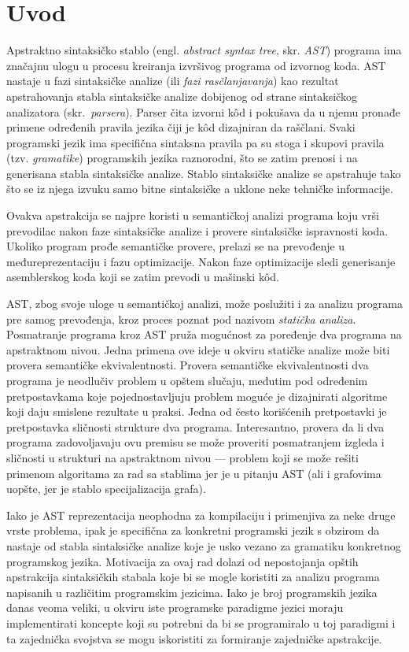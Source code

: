 \chapter{Uvod}
\label{chp:Intro}

Apstraktno sintaksičko stablo (engl. \emph{abstract syntax tree}, skr. \emph{AST}) programa ima značajnu ulogu u procesu kreiranja izvršivog programa od izvornog koda. AST nastaje u fazi sintaksičke analize (ili \emph{fazi rasčlanjavanja}) kao rezultat apstrahovanja stabla sintaksičke analize dobijenog od strane sintaksičkog analizatora (skr.~\emph{parsera}). Parser čita izvorni k\^od i pokušava da u njemu pronađe primene određenih pravila jezika čiji je k\^od dizajniran da raščlani. Svaki programski jezik ima specifična sintaksna pravila pa su stoga i skupovi pravila (tzv. \emph{gramatike}) programskih jezika raznorodni, što se zatim prenosi i na generisana stabla sintaksičke analize. Stablo sintaksičke analize se apstrahuje tako što se iz njega izvuku samo bitne sintaksičke a uklone neke tehničke informacije.

Ovakva apstrakcija se najpre koristi u semantičkoj analizi programa koju vrši prevodilac nakon faze sintaksičke analize i provere sintaksičke ispravnosti koda. Ukoliko program prođe semantičke provere, prelazi se na prevođenje u međureprezentaciju i fazu optimizacije. Nakon faze optimizacije sledi generisanje asemblerskog koda koji se zatim prevodi u mašinski k\^od.

AST, zbog svoje uloge u semantičkoj analizi, može poslužiti i za analizu programa pre samog prevođenja, kroz proces poznat pod nazivom \emph{statička analiza}. Posmatranje programa kroz AST pruža mogućnost za poređenje dva programa na apstraktnom nivou. Jedna primena ove ideje u okviru statičke analize može biti provera semantičke ekvivalentnosti. Provera semantičke ekvivalentnosti dva programa je neodlučiv problem u opštem slučaju, međutim pod određenim pretpostavkama koje pojednostavljuju problem moguće je dizajnirati algoritme koji daju smislene rezultate u praksi. Jedna od često korišćenih pretpostavki je pretpostavka sličnosti strukture dva programa. Interesantno, provera da li dva programa zadovoljavaju ovu premisu se može proveriti posmatranjem izgleda i sličnosti u strukturi na apstraktnom nivou --- problem koji se može rešiti primenom algoritama za rad sa stablima jer je u pitanju AST (ali i grafovima uopšte, jer je stablo specijalizacija grafa).

Iako je AST reprezentacija neophodna za kompilaciju i primenjiva za neke druge vrste problema, ipak je specifična za konkretni programski jezik s obzirom da nastaje od stabla sintaksičke analize koje je usko vezano za gramatiku konkretnog programskog jezika. Motivacija za ovaj rad dolazi od nepostojanja opštih apstrakcija sintaksičkih stabala koje bi se mogle koristiti za analizu programa napisanih u različitim programskim jezicima. Iako je broj programskih jezika danas veoma veliki, u okviru iste programske paradigme jezici moraju implementirati koncepte koji su potrebni da bi se programiralo u toj paradigmi i ta zajednička svojstva se mogu iskoristiti za formiranje zajedničke apstrakcije. 

